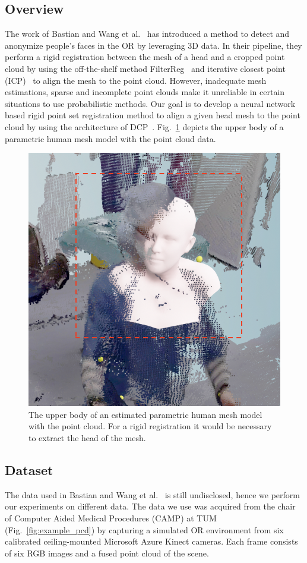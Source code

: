 \documentclass[a4paper,pagesize 10pt]{scrartcl}
\begin{document}
\subsection{Overview}
The work of Bastian and Wang et al.~\cite{disguisor} has introduced a method to detect and anonymize people's faces in the OR by leveraging 3D data.
In their pipeline, they perform a rigid registration between the mesh of a head and a cropped point cloud by using the off-the-shelf method FilterReg~\cite{filterreg} and iterative closest point (ICP)~\cite{icp} to align the mesh to the point cloud. 
However, inadequate mesh estimations, sparse and incomplete point clouds make it unreliable in certain situations to use probabilistic methods.
Our goal is to develop a neural network based rigid point set registration method to align a given head mesh to the point cloud by using the architecture of DCP~\cite{dcp}.
Fig.~\ref{fig:example_mesh} depicts the upper body of a parametric human mesh model with the point cloud data.

\begin{figure}[!ht]
    \centering
    \includegraphics[width=0.75\columnwidth]{figures/issue_pointcloud.png}
    \caption{The upper body of an estimated parametric human mesh model with the point cloud. For a rigid registration it would be necessary to extract the head of the mesh.}
    \label{fig:example_mesh}
\end{figure}

\subsection{Dataset}
The data used in Bastian and Wang et al.~\cite{disguisor} is still undisclosed, hence we perform our experiments on different data.
The data we use was acquired from the chair of Computer Aided Medical Procedures (CAMP) at TUM (Fig.~\ref{fig:example_pcd}) by capturing a simulated OR environment from six calibrated ceiling-mounted Microsoft Azure Kinect cameras.
Each frame consists of six RGB images and a fused point cloud of the scene.
\end{document}
